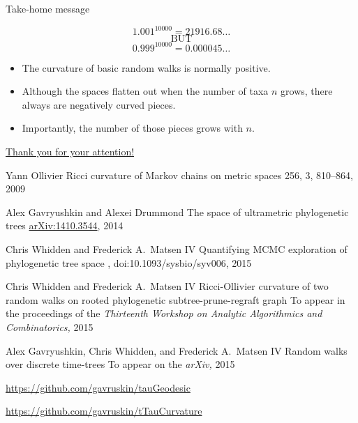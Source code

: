 \documentclass{beamer}
\theoremstyle{example}
\begin{document}
\begin{frame}{Take-home message}
\begin{block}{}
\[
1.001^{10000} = 21916.68\ldots
\]
\[
\mbox{BUT}
\]
\[
0.999^{10000} = 0.000045\ldots
\]
\end{block}

\pause

\begin{block}{}
\begin{itemize}
\item The curvature of basic random walks is normally positive.
\item Although the spaces flatten out when the number of taxa $n$ grows, there always are negatively curved pieces.
\item Importantly, the number of those pieces grows with $n$.
\end{itemize}
\end{block}
\end{frame}

\begin{frame}{\href{http://alex.gavruskin.com/pictures/}{\Large{Thank
you for your attention!}}}


\scriptsize

Yann Ollivier
\newblock Ricci curvature of Markov chains on metric spaces
 256, 3, 810--864, 2009

Alex Gavryushkin and Alexei Drummond
\newblock The space of ultrametric phylogenetic trees
 \href{http://arxiv.org/abs/1410.3544}{arXiv:1410.3544}, 2014

Chris Whidden and Frederick A.\ Matsen IV
\newblock Quantifying MCMC exploration of phylogenetic tree space
, doi:10.1093/sysbio/syv006, 2015

Chris Whidden and Frederick A.\ Matsen IV
\newblock Ricci-Ollivier curvature of two random walks on rooted phylogenetic subtree-prune-regraft graph
\newblock To appear in the proceedings of the {\em Thirteenth Workshop on Analytic Algorithmics and Combinatorics,} 2015

Alex Gavryushkin, Chris Whidden, and Frederick A.\ Matsen IV
\newblock Random walks over discrete time-trees
\newblock To appear on the {\em arXiv,} 2015

\url{https://github.com/gavruskin/tauGeodesic}

\url{https://github.com/gavruskin/tTauCurvature}
\end{frame}
\end{document}

